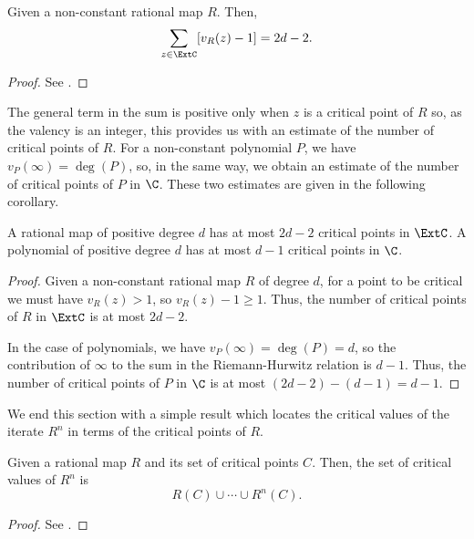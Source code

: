 \begin{theorem}
    Given a non-constant rational map $R$. Then,
    \[
        \sum_{z \in \ExtC} [v_R(z) - 1] = 2d - 2.
    \]
\end{theorem}
\begin{proof}
    See \cite[44]{Beardon1991}.
\end{proof}

The general term in the sum is positive only when $z$ is a critical point of $R$
so, as the valency is an integer, this provides us with an estimate of the
number of critical points of $R$. For a non-constant polynomial $P$, we have
$v_P(\infty) = \deg(P)$, so, in the same way, we obtain an estimate of the
number of critical points of $P$ in $\C$. These two estimates are given in the
following corollary.

\begin{corollary}
    A rational map of positive degree $d$ has at most $2d - 2$ critical points
    in $\ExtC$. A polynomial of positive degree $d$ has at most $d - 1$ critical
    points in $\C$.
\end{corollary}
\begin{proof}
    Given a non-constant rational map $R$ of degree $d$, for a point to be
    critical we must have $v_R(z) > 1$, so $v_R(z) - 1 \geq 1$. Thus, the number
    of critical points of $R$ in $\ExtC$ is at most $2d - 2$.

    In the case of polynomials, we have $v_P(\infty) = \deg(P) = d$, so the
    contribution of $\infty$ to the sum in the Riemann-Hurwitz relation is $d -
    1$. Thus, the number of critical points of $P$ in $\C$ is at most $(2d - 2)
    - (d - 1) = d - 1$.
\end{proof}

We end this section with a simple result which locates the critical values of
the iterate $R^n$ in terms of the critical points of $R$.

\begin{theorem}
    Given a rational map $R$ and its set of critical points $C$. Then, the set
    of critical values of $R^n$ is
    \[
        R(C) \cup \cdots \cup R^n(C).
    \]
\end{theorem}
\begin{proof}
    See \cite[45]{Beardon1991}.
\end{proof}


